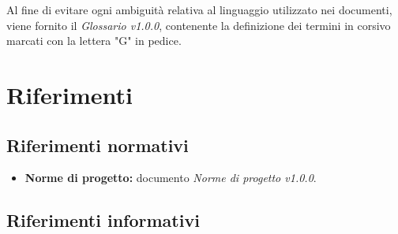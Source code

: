 \documentclass[openany,12pt,a4paper]{report}
\begin{document}
	Al fine di evitare ogni ambiguità relativa al linguaggio utilizzato nei documenti, viene fornito il \textit{Glossario v1.0.0}, contenente la definizione dei termini in corsivo marcati con la lettera "G" in pedice.
	
	\section{Riferimenti}
	
	\subsection{Riferimenti normativi}
	
	\begin{itemize}
		
		\item \textbf{Norme di progetto:} documento \textit{Norme di progetto v1.0.0}.
		
	\end{itemize}
	
	\subsection{Riferimenti informativi}
	
\end{document}

